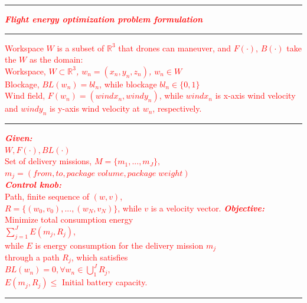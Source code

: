 \documentclass[journal]{./template/IEEEtran}
\begin{document}
\textcolor{red}{
\vspace{7pt}
\hrule
\vspace{5pt}
\noindent\textit{\textbf{Flight energy optimization problem formulation}}
\vspace{5pt}
\hrule
\vspace{5pt}
\noindent Workspace $W$ is a subset of $\mathbb{R}^3$ that drones can maneuver, and $F(\cdot)$, $B(\cdot)$ take the $W$ as the domain:\\
\indent Workspace, \textit{$W\subset\mathbb{R}^3$, $w_n=(x_n,y_n,z_n)$, $w_n \in W$ }\\
\indent Blockage, \textit{$BL(w_n)=bl_n$}, while blockage $bl_n\in\{0,1\}$\\
\indent Wind field, \textit{$F(w_n) = (windx_n, windy_n)$}, while $windx_n$ is  
\indent x-axis wind velocity and $windy_n$ is y-axis wind velocity
\indent at $w_n$, respectively.
\vspace{5pt}
\hrule
\vspace{5pt}
\noindent\textit{\textbf{Given:}}~\\
\indent $W, F(\cdot), BL(\cdot)$~\\
\indent Set of delivery missions, $M = \{m_1, ..., m_J\},$~\\ 
\indent $m_j = (from, to, package\;volume, package\;weight)$~\\
\noindent\textit{\textbf{Control knob:}}~\\
\indent Path, finite sequence of $(w,v)$,~\\
\indent $R = \{(w_0,v_0), ..., (w_N,v_N)\}$, while $v$ is a velocity vector.
\noindent\textit{\textbf{Objective:}}~\\ 
\indent Minimize total consumption energy~\\
\indent\indent $\sum_{j=1}^J E(m_j,R_j)$,~\\
\indent while $E$ is energy consumption for the delivery mission $m_j$~\\
\indent through a path $R_j$, which satisfies~\\
\indent\indent $BL(w_n) = 0, \forall w_n \in \bigcup_{1}^J R_j,$~\\
\indent\indent $E(m_j, R_j) \leq$ Initial battery capacity.
\vspace{5pt}
\hrule
\vspace{5pt}
}
\vspace{5pt}
\end{document}
